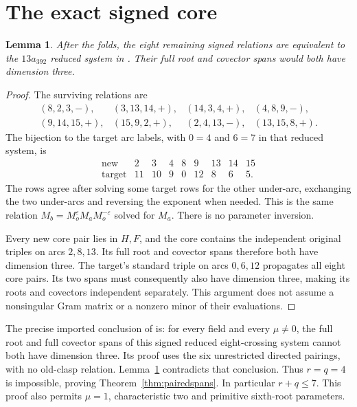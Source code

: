 \documentclass[11pt]{article}
\newtheorem{lemma}[theorem]{Lemma}
\begin{document}
\section{The exact signed core}

\begin{lemma}\label{lem:coretransfer}
After the folds, the eight remaining signed relations are
equivalent to the $13a_{392}$ reduced system in
\cite[Lemma \texttt{lem:cores}]{extensions}. Their full root and
covector spans would both have dimension three.
\end{lemma}
\begin{proof}
The surviving relations are
\[
\begin{array}{rrrr}
(8,2,3,-),&(3,13,14,+),&(14,3,4,+),&(4,8,9,-),\\
(9,14,15,+),&(15,9,2,+),&(2,4,13,-),&(13,15,8,+).
\end{array}
\]
The bijection to the target arc labels, with $0=4$ and $6=7$
in that reduced system, is
\[
\begin{array}{c|rrrrrrrr}
\text{new}&2&3&4&8&9&13&14&15\\\hline
\text{target}&11&10&9&0&12&8&6&5 .
\end{array}
\]
The rows agree after solving some target rows for the other
under-arc, exchanging the two under-arcs and reversing the exponent
when needed. This is the same relation
$M_b=M_o^\varepsilon M_aM_o^{-\varepsilon}$ solved for $M_a$.
There is no parameter inversion.

Every new core pair lies in $H,F$, and the core contains the
independent original triples on arcs $2,8,13$.
Its full root and covector spans therefore both have dimension
three. The target's standard triple on arcs $0,6,12$ propagates
all eight core pairs. Its two spans must consequently also have
dimension three, making its roots and covectors independent
separately. This argument does not assume a nonsingular Gram
matrix or a nonzero minor of their evaluations.
\end{proof}

The precise imported conclusion of
\cite[Lemma \texttt{lem:cores}, $392$ case]{extensions} is:
for every field and every $\mu\ne0$, the full root and full
covector spans of this signed reduced eight-crossing system
cannot both have dimension three. Its proof uses the six
unrestricted directed pairings, with no old-clasp relation.
Lemma~\ref{lem:coretransfer} contradicts that conclusion.
Thus $r=q=4$ is impossible, proving
Theorem~\ref{thm:pairedspans}. In particular $r+q\le7$.
This proof also permits $\mu=1$, characteristic two and
primitive sixth-root parameters.
\end{document}
